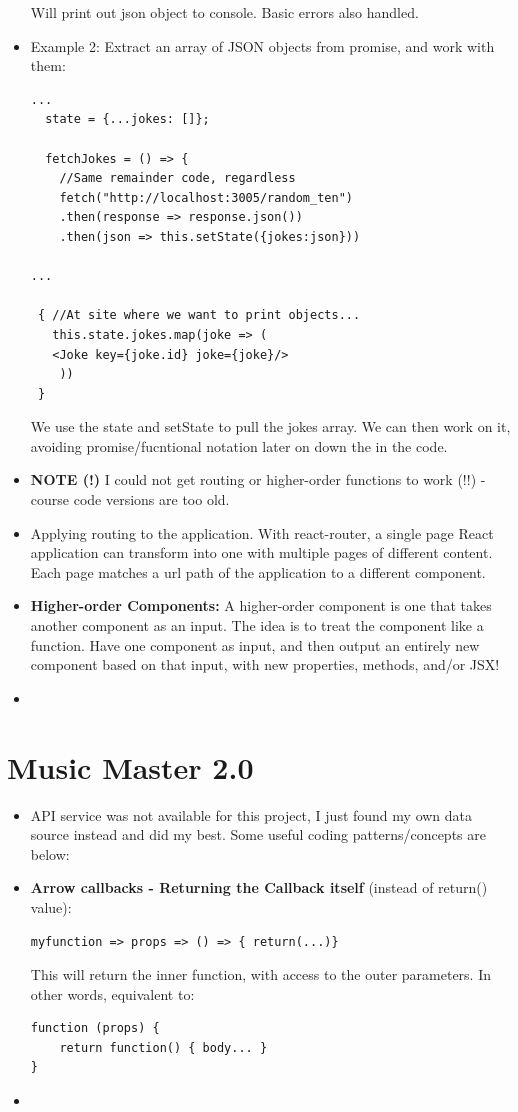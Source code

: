 \documentclass[8pt,a4paper]{extarticle}
\begin{document}
\begin{itemize}
Will print out json object to console. Basic errors also handled.

\item Example 2: Extract an array of JSON objects from promise, and work with them:

\begin{verbatim}
...
  state = {...jokes: []};

  fetchJokes = () => {
    //Same remainder code, regardless
    fetch("http://localhost:3005/random_ten")
    .then(response => response.json())
    .then(json => this.setState({jokes:json}))

...

 { //At site where we want to print objects...
   this.state.jokes.map(joke => (
   <Joke key={joke.id} joke={joke}/>
    ))
 }
\end{verbatim}

We use the state and setState to pull the jokes array. We can then work on it, avoiding promise/fucntional notation later on down the in the code.

\item \textbf{NOTE (!)} I could not get routing or higher-order functions to work (!!) - course code versions are too old.
\item Applying routing to the application. With react-router, a single page React application can transform into one with multiple pages of different content. Each page matches a url path of the application to a different component.
\item \textbf{Higher-order Components:} A higher-order component is one that takes another component as an input. The idea is to treat the component like a function. Have one component as input, and then output an entirely new component based on that input, with new properties, methods, and/or JSX!
\item
\end{itemize}

\section*{Music Master 2.0}

\begin{itemize}
\item API service was not available for this project, I just found my own data source instead and did my best. Some useful coding patterns/concepts are below:

\item \textbf{Arrow callbacks - Returning the Callback itself} (instead of return() value):

\begin{verbatim}
myfunction => props => () => { return(...)}
\end{verbatim}

This will return the inner function, with access to the outer parameters. In other words, equivalent to:

\begin{verbatim}
function (props) {
	return function() { body... }
}
\end{verbatim}
\item
\end{itemize}
\end{document}
